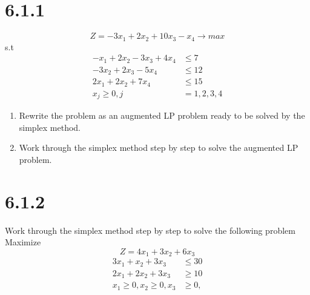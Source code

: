 \documentclass{article}
\begin{document}
\section*{6.1.1}
\begin{equation*}
  Z = -3x_{1} + 2x_{2} + 10x_{3} - x_{4} \rightarrow max
\end{equation*}
s.t
\begin{align*}
-x_{1} + 2x_{2} - 3x_{3} + 4x_{4} &\leq 7\\
       - 3x_{2} + 2x_{3} - 5x_{4} &\leq 12\\
2x_{1} + 2x_{2}          + 7x_{4} &\leq 15\\
x_{j} \geq 0, j &= 1, 2, 3, 4
\end{align*}
\begin{enumerate}
  \item Rewrite the problem as an augmented LP problem ready to be solved by the simplex method.
  \item Work through the simplex method step by step to solve the augmented LP problem.
\end{enumerate}

\section*{6.1.2}
Work through the simplex method step by step to solve the following problem
Maximize
\begin{equation*}
  Z = 4x_{1} + 3x_{2} + 6x_{3}
\end{equation*}
\begin{align*}
  3x_{1} + x_{2} + 3x_{3} &\leq 30\\
  2x_{1} + 2x_{2} + 3x_{3} &\geq 10\\
  x_{1} \geq 0, x_{2} \geq 0, x_{3} &\geq 0,
\end{align*}
\end{document}

